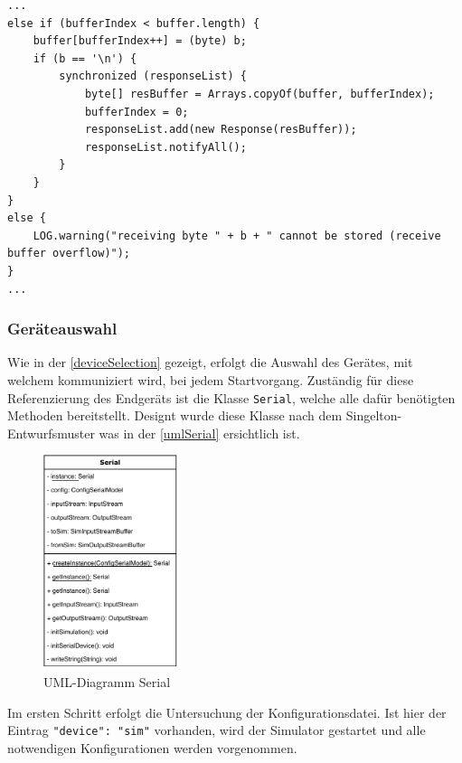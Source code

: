 \newpage
\begin{lstlisting}[style=java,caption=Teilabschnitt CommunicationReceiveThread,label=commThreadSend]
...
else if (bufferIndex < buffer.length) {
    buffer[bufferIndex++] = (byte) b;
    if (b == '\n') {
        synchronized (responseList) {
            byte[] resBuffer = Arrays.copyOf(buffer, bufferIndex);
            bufferIndex = 0;
            responseList.add(new Response(resBuffer));
            responseList.notifyAll();
        }
    }
}
else {
    LOG.warning("receiving byte " + b + " cannot be stored (receive buffer overflow)");
}
...
\end{lstlisting}
\subsubsection{Geräteauswahl} \label{sssec:deviceSelection}
Wie in der \autoref{deviceSelection} gezeigt, erfolgt die Auswahl des Gerätes, mit welchem kommuniziert wird, bei jedem Startvorgang.
Zuständig für diese Referenzierung des Endgeräts ist die Klasse \lstinline[style=java]{Serial}, welche alle dafür benötigten Methoden bereitstellt.
Designt wurde diese Klasse nach dem Singelton-Entwurfsmuster was in der \autoref{umlSerial} ersichtlich ist.
\begin{figure}[H]
\centering
\includegraphics[width=0.35\textwidth]{fig/ainf/SerialUML.pdf}
\caption{UML-Diagramm Serial}
\label{umlSerial}
\end{figure}
Im ersten Schritt erfolgt die Untersuchung der Konfigurationsdatei.
Ist hier der Eintrag \lstinline[style=json]{"device": "sim"} vorhanden, wird der Simulator gestartet und alle notwendigen Konfigurationen werden vorgenommen.
